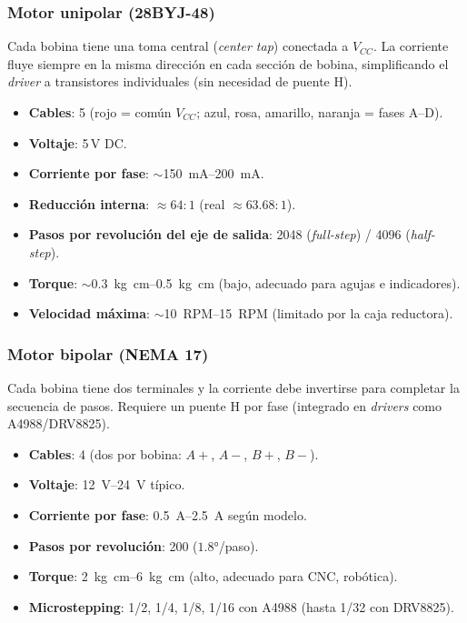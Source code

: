 \documentclass[11pt]{article}
\begin{document}
\subsubsection{Motor unipolar (28BYJ-48)}
Cada bobina tiene una toma central (\emph{center tap}) conectada a $V_{CC}$. La corriente
fluye siempre en la misma dirección en cada sección de bobina, simplificando el
\emph{driver} a transistores individuales (sin necesidad de puente H).
\begin{itemize}
  \item \textbf{Cables}: 5 (rojo = común $V_{CC}$; azul, rosa, amarillo, naranja = fases
        A--D).
  \item \textbf{Voltaje}: 5\,V DC.
  \item \textbf{Corriente por fase}: $\sim$\SIrange{150}{200}{\milli\ampere}.
  \item \textbf{Reducción interna}: $\approx 64{:}1$ (real $\approx 63.68{:}1$).
  \item \textbf{Pasos por revolución del eje de salida}: 2048 (\emph{full-step}) / 4096
        (\emph{half-step}).
  \item \textbf{Torque}: $\sim$\SIrange{0.3}{0.5}{\kilo\gram\centi\meter} (bajo, adecuado
        para agujas e indicadores).
  \item \textbf{Velocidad máxima}: $\sim$\SIrange{10}{15}{RPM} (limitado por la caja
        reductora).
\end{itemize}

\subsubsection{Motor bipolar (NEMA 17)}
Cada bobina tiene dos terminales y la corriente debe invertirse para completar la
secuencia de pasos. Requiere un puente H por fase (integrado en \emph{drivers} como
A4988/DRV8825).
\begin{itemize}
  \item \textbf{Cables}: 4 (dos por bobina: $A+$, $A-$, $B+$, $B-$).
  \item \textbf{Voltaje}: \SIrange{12}{24}{\volt} típico.
  \item \textbf{Corriente por fase}: \SIrange{0.5}{2.5}{\ampere} según modelo.
  \item \textbf{Pasos por revolución}: 200 ($1.8\si{\degree}$/paso).
  \item \textbf{Torque}: \SIrange{2}{6}{\kilo\gram\centi\meter} (alto, adecuado para CNC,
        robótica).
  \item \textbf{Microstepping}: 1/2, 1/4, 1/8, 1/16 con A4988 (hasta 1/32 con DRV8825).
\end{itemize}
\end{document}
